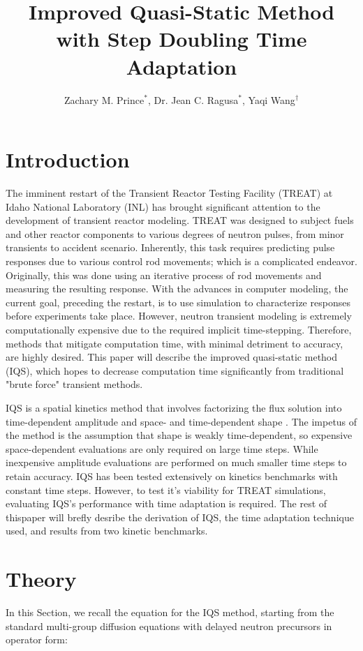 \documentclass{anstrans}
\title{Improved Quasi-Static Method with Step Doubling Time Adaptation}
\author{Zachary M. Prince$^{*}$, Dr. Jean C. Ragusa$^{*}$, Yaqi Wang$^{\dagger}$}
\institute{
$^{*}$Department of Nuclear Engineering, Texas A\&M University, College Station, TX
\and
$^{\dagger}$Idaho National Laboratory, Idaho Falls, ID
}
\begin{document}
\section{Introduction}
The imminent restart of the Transient Reactor Testing Facility (TREAT) at Idaho National Laboratory (INL) has brought significant attention to the development of transient reactor modeling.  TREAT was designed to subject fuels and other reactor components to various degrees of neutron pulses, from minor transients to accident scenario.  Inherently, this task requires predicting pulse responses due to various control rod movements; which is a complicated endeavor.  Originally, this was done using an iterative process of rod movements and measuring the resulting response.  With the advances in computer modeling, the current goal, preceding the restart, is to use simulation to characterize responses before experiments take place.  However, neutron transient modeling is extremely computationally expensive due to the required implicit time-stepping.  Therefore, methods that mitigate computation time, with minimal detriment to accuracy, are highly desired.  This paper will describe the improved quasi-static method (IQS), which hopes to decrease computation time significantly from traditional "brute force" transient methods.

IQS is a spatial kinetics method that involves factorizing the flux solution into time-dependent amplitude and space- and time-dependent shape \cite{Ott_1966,Dulla2008}.  The impetus of the method is the assumption that shape is weakly time-dependent, so expensive space-dependent evaluations are only required on large time steps.  While inexpensive amplitude evaluations are performed on much smaller time steps to retain accuracy.  IQS has been tested extensively on kinetics benchmarks with constant time steps.  However, to test it's viability for TREAT simulations, evaluating IQS's performance with time adaptation is required.  The rest of thispaper will brefly desribe the derivation of IQS, the time adaptation technique used, and results from two kinetic benchmarks.

\section{Theory}
In this Section, we recall the equation for the IQS method, starting from the standard multi-group diffusion equations with delayed neutron precursors in operator form:
\end{document}
